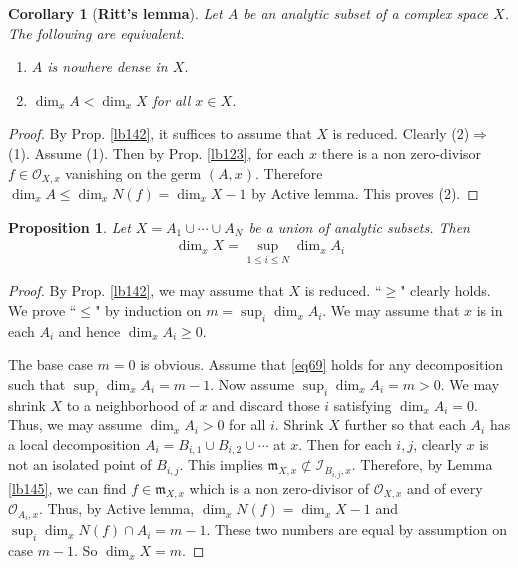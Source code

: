 \documentclass[12pt,b5paper,notitlepage]{report}
\theoremstyle{definition}
\theoremstyle{plain}
\newtheorem{pp}[df]{Proposition}
\newtheorem{co}[df]{Corollary}
\newcommand{\fk}{\mathfrak}
\newcommand{\scr}{\mathscr}
\numberwithin{equation}{section}
\begin{document}

\begin{co}[\textbf{Ritt's lemma}]\label{lb147}
Let $A$ be an analytic subset of a complex space $X$. The following are equivalent.
\begin{enumerate}[label=(\arabic*)]
\item $A$ is nowhere dense in $X$.
\item $\dim_xA<\dim_xX$ for all $x\in X$.
\end{enumerate}
\end{co}


\begin{proof}
By Prop. \ref{lb142}, it suffices to assume that $X$ is reduced. Clearly (2)$\Rightarrow$(1). Assume (1). Then by Prop. \ref{lb123}, for each $x$ there is a non zero-divisor $f\in\scr O_{X,x}$ vanishing on the germ $(A,x)$. Therefore $\dim_xA\leq \dim_xN(f)=\dim_xX-1$ by Active lemma. This proves (2).
\end{proof}




\begin{pp}\label{lb146}
Let $X=A_1\cup\cdots\cup A_N$ be a union of analytic subsets. Then
\begin{align}
\dim_xX=\sup_{1\leq i\leq N}\dim_xA_i\label{eq69}
\end{align}
\end{pp}

\begin{proof}
By Prop. \ref{lb142}, we may assume that $X$ is reduced. ``$\geq$" clearly holds. We prove ``$\leq$" by induction on $m=\sup_i\dim_xA_i$. We may assume that $x$ is in each $A_i$ and hence $\dim_xA_i\geq0$. 

The base case $m=0$ is obvious. Assume that \eqref{eq69} holds for any decomposition such that $\sup_i\dim_xA_i=m-1$. Now assume $\sup_i\dim_xA_i=m>0$. We may shrink $X$ to a neighborhood of $x$ and discard those $i$ satisfying $\dim_x A_i=0$. Thus, we may assume $\dim_x A_i>0$ for all $i$.  Shrink $X$ further so that each $A_i$ has a local decomposition $A_i=B_{i,1}\cup B_{i,2}\cup\cdots$ at $x$. Then for each $i,j$, clearly $x$ is not an isolated point of $B_{i,j}$. This implies $\fk m_{X,x}\nsubset\scr I_{B_{i,j},x}$. Therefore, by Lemma \ref{lb145}, we can find $f\in\fk m_{X,x}$ which is a non zero-divisor of $\scr O_{X,x}$ and of every $\scr O_{A_i,x}$. Thus, by Active lemma, $\dim_xN(f)=\dim_xX-1$ and $\sup_i\dim_x N(f)\cap A_i=m-1$. These two numbers are equal by assumption on case $m-1$. So $\dim_xX=m$.
\end{proof}
\end{document}
